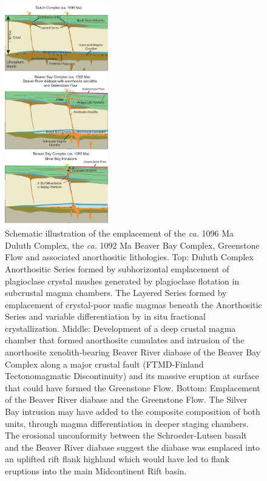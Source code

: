 \begin{figure}[h!]
\centering
\noindent\includegraphics[width=0.4\textwidth]{figure/Zhang2021/Flank_eruption.pdf}
\caption{\footnotesize{Schematic illustration of the emplacement of the \textit{ca.} 1096 Ma Duluth Complex, the \textit{ca.} 1092 Ma Beaver Bay Complex, Greenstone Flow and associated anorthositic lithologies. Top: Duluth Complex Anorthositic Series formed by subhorizontal emplacement of plagioclase crystal mushes generated by plagioclase flotation in subcrustal magma chambers. The Layered Series formed by emplacement of crystal-poor mafic magmas beneath the Anorthositic Series and variable differentiation by in situ fractional crystallization. Middle: Development of a deep crustal magma chamber that formed anorthosite cumulates and intrusion of the anorthosite xenolith-bearing Beaver River diabase of the Beaver Bay Complex along a major crustal fault (FTMD-Finland Tectonomagmatic Discontinuity) and its massive eruption at surface that could have formed the Greenstone Flow. Bottom: Emplacement of the Beaver River diabase and the Greenstone Flow. The Silver Bay intrusion may have added to the composite composition of both units, through magma differentiation in deeper staging chambers. The erosional unconformity between the Schroeder-Lutsen basalt and the Beaver River diabase suggest the diabase was emplaced into an uplifted rift flank highland which would have led to flank eruptions into the main Midcontinent Rift basin.}}
\label{fig:Flank_eruption}
\end{figure}

